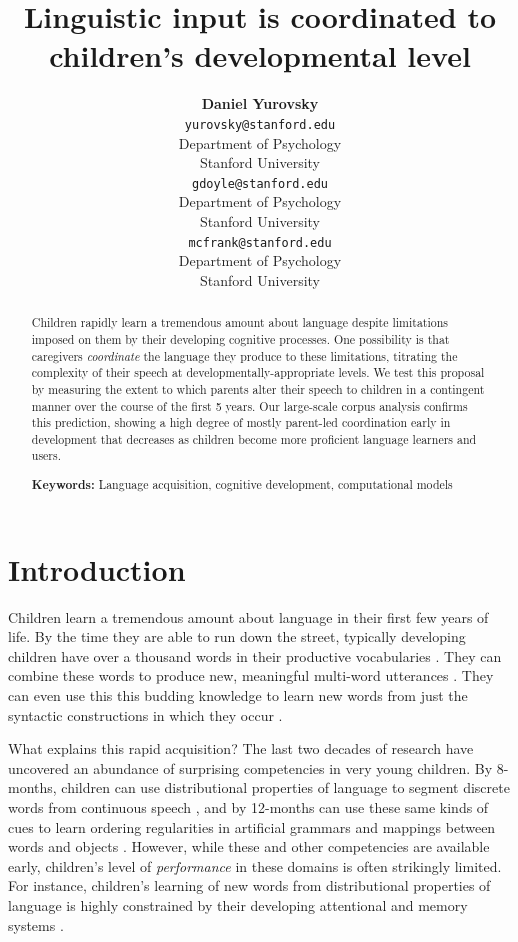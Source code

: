 \documentclass[10pt,letterpaper]{article}
\title{Linguistic input is coordinated to children's developmental level}
\author{{\large \bf Daniel Yurovsky} \\ \texttt{yurovsky@stanford.edu}\\ Department of Psychology \\ Stanford University
 	\And {\large \bf Gabriel Doyle} \\ \texttt{gdoyle@stanford.edu} \\ Department of Psychology \\ Stanford University
	\And {\large \bf Michael C. Frank} \\ \texttt{mcfrank@stanford.edu} \\ Department of Psychology \\ Stanford University}
\begin{document}
\maketitle

\begin{abstract}

Children rapidly learn a tremendous amount about language despite limitations imposed on them by their developing cognitive processes. One possibility is that caregivers \emph{coordinate} the language they produce to these limitations, titrating the complexity of their speech at developmentally-appropriate levels. We test this proposal by measuring the extent to which parents alter their speech to children in a contingent manner over the course of the first 5 years. Our large-scale corpus analysis confirms this prediction, showing a high degree of mostly parent-led coordination early in development that decreases as children become more proficient language learners and users. 

\textbf{Keywords:} 
Language acquisition, cognitive development, computational models
\end{abstract}

\section{Introduction}

Children learn a tremendous amount about language in their first few years of life. By the time they are able to run down the street, typically developing children have over a thousand words in their productive vocabularies \cite{mayor2011}. They can combine these words to produce new, meaningful multi-word utterances \cite{lieven2009}. They can even use this this budding knowledge to learn new words from just the syntactic constructions in which they occur \cite{yuan2009}.

What explains this rapid acquisition? The last two decades of research have uncovered an abundance of surprising competencies in very young children. By 8-months, children can use distributional properties of language to segment discrete words from continuous speech \cite{saffran1996}, and by 12-months can use these same kinds of cues to learn ordering regularities in artificial grammars \cite{gomez1999} and mappings between words and objects \cite{smith2008}. However, while these and other competencies are available early, children's level of \emph{performance} in these domains is often strikingly limited. For instance, children's learning of new words from distributional properties of language is highly constrained by their developing attentional and memory systems \cite{vlach2012, vlach2013}. 
\end{document}
